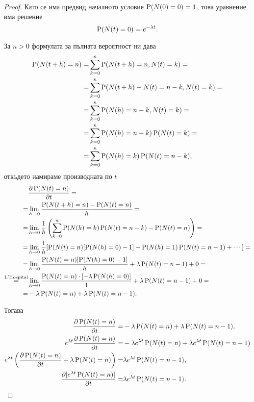 \documentclass[numbers=endperiod, bibliography=totocnumbered]{scrartcl}
\begin{document}
\begin{proof}
  Като се има предвид началното условие \( \operatorname{P}(N(0) = 0) = 1 \), това уравнение има решение
  \begin{align*}
   \operatorname{P}(N(t) = 0) = e^{-\lambda t}.
  \end{align*}

  За \( n > 0 \) формулата за пълната вероятност ни дава
  \begin{align*}
    \operatorname{P}(N(t+h) = n)
    =&
    \sum_{k=0}^n \operatorname{P}(N(t+h) = n, N(t) = k)
    = \\ =&
    \sum_{k=0}^n \operatorname{P}(N(t+h) - N(t) = n - k, N(t) = k)
    = \\ =&
    \sum_{k=0}^n \operatorname{P}(N(h) = n - k, N(t) = k)
    = \\ =&
    \sum_{k=0}^n \operatorname{P}(N(h) = n - k) \operatorname{P}(N(t) = k)
    = \\ =&
    \sum_{k=0}^n \operatorname{P}(N(h) = k) \operatorname{P}(N(t) = n - k),
  \end{align*}
  откъдето намираме производната по \( t \)
  \begin{align*}
    &\frac {\partial \operatorname{P}(N(t) = n)} {\partial t}
    = \\ =&
    \lim_{h \to 0} \frac {\operatorname{P}(N(t+h) = n) - \operatorname{P}(N(t) = n)} h
    = \\ =&
    \lim_{h \to 0} \frac 1 h \left( \sum_{k=0}^n \operatorname{P}(N(h) = k) \operatorname{P}(N(t) = n - k) - \operatorname{P}(N(t) = n) \right)
    = \\ =&
    \lim_{h \to 0} \frac 1 h [\operatorname{P}(N(t) = n) [\operatorname{P}(N(h) = 0) - 1] + \operatorname{P}(N(h) = 1) \operatorname{P}(N(t) = n - 1) + \cdots]
    = \\ =&
    \lim_{h \to 0} \frac {\operatorname{P}(N(t) = n) [\operatorname{P}(N(h) = 0) - 1]} h + \lambda \operatorname{P}(N(t) = n - 1) + 0
    = \\ \overset {\text{L'Hospital}} =&
    \lim_{h \to 0} \frac {\operatorname{P}(N(t) = n) \cdot [-\lambda \operatorname{P}(N(h) = 0)]} 1 + \lambda \operatorname{P}(N(t) = n - 1) + 0
    = \\ =&
    -\lambda \operatorname{P}(N(t) = n) + \lambda \operatorname{P}(N(t) = n - 1).
  \end{align*}

  Тогава
  \begin{align*}
    \frac {\partial \operatorname{P}(N(t) = n)} {\partial t}
    =&
    -\lambda \operatorname{P}(N(t) = n) + \lambda \operatorname{P}(N(t) = n - 1),
    \\
    e^{\lambda t} \frac {\partial \operatorname{P}(N(t) = n)} {\partial t}
    =&
    -\lambda e^{\lambda t} \operatorname{P}(N(t) = n) + \lambda e^{\lambda t} \operatorname{P}(N(t) = n - 1)
    \\
    e^{\lambda t} \left(\frac {\partial \operatorname{P}(N(t) = n)} {\partial t} + \lambda \operatorname{P}(N(t) = n) \right)
    =&
    \lambda e^{\lambda t} \operatorname{P}(N(t) = n - 1),
    \\
    \frac {\partial [e^{\lambda t} \operatorname{P}(N(t) = n)]} {\partial t}
    =&
    \lambda e^{\lambda t} \operatorname{P}(N(t) = n - 1).
  \end{align*}


\end{proof}
\end{document}

